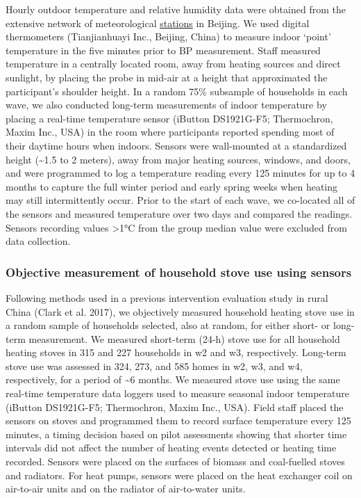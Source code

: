 \documentclass[
  letterpaper,
  DIV=11,
  numbers=noendperiod]{scrartcl}
\begin{document}
Hourly outdoor temperature and relative humidity data were obtained from
the extensive network of meteorological
\href{http://beijingair.sinaapp.com}{stations} in Beijing. We used
digital thermometers (Tianjianhuayi Inc., Beijing, China) to measure
indoor `point' temperature in the five minutes prior to BP measurement.
Staff measured temperature in a centrally located room, away from
heating sources and direct sunlight, by placing the probe in mid-air at
a height that approximated the participant's shoulder height. In a
random 75\% subsample of households in each wave, we also conducted
long-term measurements of indoor temperature by placing a real-time
temperature sensor (iButton DS1921G-F5; Thermochron, Maxim Inc., USA) in
the room where participants reported spending most of their daytime
hours when indoors. Sensors were wall-mounted at a standardized height
(\textasciitilde1.5 to 2 meters), away from major heating sources,
windows, and doors, and were programmed to log a temperature reading
every 125 minutes for up to 4 months to capture the full winter period
and early spring weeks when heating may still intermittently occur.
Prior to the start of each wave, we co-located all of the sensors and
measured temperature over two days and compared the readings. Sensors
recording values \textgreater1°C from the group median value were
excluded from data collection.

\hypertarget{objective-measurement-of-household-stove-use-using-sensors}{%
\subsubsection{Objective measurement of household stove use using
sensors}\label{objective-measurement-of-household-stove-use-using-sensors}}

Following methods used in a previous intervention evaluation study in
rural China (Clark et al. 2017), we objectively measured household
heating stove use in a random sample of households selected, also at
random, for either short- or long-term measurement. We measured
short-term (24-h) stove use for all household heating stoves in 315 and
227 households in w2 and w3, respectively. Long-term stove use was
assessed in 324, 273, and 585 homes in w2, w3, and w4, respectively, for
a period of \textasciitilde6 months. We measured stove use using the
same real-time temperature data loggers used to measure seasonal indoor
temperature (iButton DS1921G-F5; Thermochron, Maxim Inc., USA). Field
staff placed the sensors on stoves and programmed them to record surface
temperature every 125 minutes, a timing decision based on pilot
assessments showing that shorter time intervals did not affect the
number of heating events detected or heating time recorded. Sensors were
placed on the surfaces of biomass and coal-fuelled stoves and radiators.
For heat pumps, sensors were placed on the heat exchanger coil on
air-to-air units and on the radiator of air-to-water units.
\end{document}
